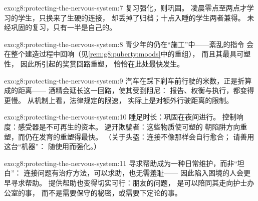 \begin{solution}{exo:g8:protecting-the-nervous-system:7}
复习强化，则巩固。
凌晨零点至两点才学习的学生，只换来了生硬的连接，
却丢掉了归档；十点入睡的学生两者兼得。
未经巩固的复习，只有一半是自己的。
\end{solution}

\begin{solution}{exo:g8:protecting-the-nervous-system:8}
青少年的仍在“施工”中——紊乱的指令
会在整个建造过程中回响（见\cref{rem:g8:puberty:moods}中的重组），
而且其最具可塑性，
因此所引起的奖赏回路重塑，
恰恰在此处最快发生。
\end{solution}

\begin{solution}{exo:g8:protecting-the-nervous-system:9}
汽车在踩下刹车前行驶的米数，正是折算成的距离——
酒精会延长这一回路，使其受到阻尼：
报告、权衡与执行，都变得更慢。
从机制上看，法律规定的限速，
实际上是对额外行驶距离的限制。
\end{solution}

\begin{solution}{exo:g8:protecting-the-nervous-system:10}
睡足时长：巩固在夜间进行。
控制响度：感受器是不可再生的资本。
避开欺骗者：这些物质使可塑的
朝陷阱方向重塑，而仍在发育的重塑得最快。
（关于头盔：连接不像那样会自行愈合；
请善用这台“机器”：
随使用而强化。）
\end{solution}

\begin{solution}{exo:g8:protecting-the-nervous-system:11}
寻求帮助成为一种日常维护，而非“坦白”：
连接问题有治疗方法，可以求助，也无需羞耻——
因此陷入困境的人会更早寻求帮助。
提供帮助也变得切实可行：朋友的问题，
是可以陪同其走向护士办公室的事，
而不是需要保守的秘密，或需要下定论的事。
\end{solution}


